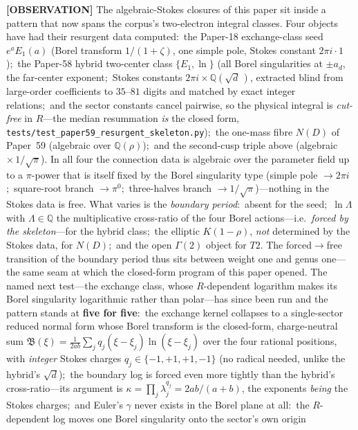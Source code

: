 \documentclass[aps,pra,twocolumn,superscriptaddress,longbibliography]{revtex4-2}
\begin{document}
\textbf{[OBSERVATION]} The algebraic-Stokes closures of this paper sit inside a pattern that now
spans the corpus's two-electron integral classes.  Four objects have had their resurgent data
computed:\ the Paper-18 exchange-class seed $e^{a}E_{1}(a)$ (Borel transform $1/(1+\zeta)$, one
simple pole, Stokes constant $2\pi i\cdot1$);\ the Paper-58 hybrid two-center class
$\{E_{1},\ln\}$ (all Borel singularities at $\pm a_{d}$, the far-center exponent;\ Stokes
constants $2\pi i\times\mathbb{Q}(\sqrt d\,)$, extracted blind from large-order coefficients to
$35$--$81$ digits and matched by exact integer relations;\ and the sector constants cancel
pairwise, so the physical integral is \emph{cut-free} in $R$---the median resummation \emph{is}
the closed form, \texttt{tests/test\_paper59\_resurgent\_skeleton.py});\ the one-mass fibre
$N(D)$ of Paper~59 (algebraic over $\mathbb{Q}(\rho)$);\ and the second-cusp
triple above (algebraic $\times\,1/\sqrt\pi$).  In all four the connection data is algebraic
over the parameter field up to a $\pi$-power that is itself fixed by the Borel singularity type
(simple pole $\to2\pi i$;\ square-root branch $\to\pi^{0}$;\ three-halves branch
$\to1/\sqrt\pi$)---nothing in the Stokes data is free.  What varies is the \emph{boundary
period}:\ absent for the seed;\ $\ln\Lambda$ with $\Lambda\in\mathbb{Q}$ the multiplicative
cross-ratio of the four Borel actions---i.e.\ \emph{forced by the skeleton}---for the hybrid
class;\ the elliptic $K(1-\rho)$, \emph{not} determined by the Stokes data, for $N(D)$;\ and the
open $\Gamma(2)$ object for $T2$.  The forced$\to$free transition of the boundary period thus
sits between weight one and genus one---the same seam at which the closed-form program of this
paper opened.  The named next test---the exchange class, whose $R$-dependent logarithm makes
its Borel singularity logarithmic rather than polar---has since been run and the pattern stands
at \textbf{five for five}:\ the exchange kernel collapses to a single-sector reduced normal
form whose Borel transform is the closed-form, charge-neutral sum
$\mathfrak{B}(\xi)=\tfrac{1}{2ab}\sum_{j}q_{j}(\xi-\xi_{j})\ln(\xi-\xi_{j})$ over the four
rational positions, with \emph{integer} Stokes charges $q_{j}\in\{-1,+1,+1,-1\}$ (no radical
needed, unlike the hybrid's $\sqrt d$);\ the boundary log is forced even more tightly than the
hybrid's cross-ratio---its argument is $\kappa=\prod_{j}\lambda_{j}^{q_{j}}=2ab/(a{+}b)$, the
exponents \emph{being} the Stokes charges;\ and Euler's $\gamma$ never exists in the Borel
plane at all:\ the $R$-dependent log moves one Borel singularity onto the sector's own origin
\end{document}
